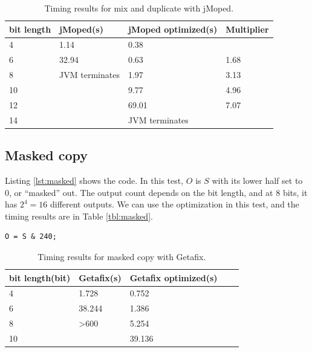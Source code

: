 \begin{table}[!h]
\begin{center}
\begin{tabular}{|l|l|l|l|}
\hline
bit length & jMoped(s) & jMoped optimized(s) & Multiplier \\ \hline
4 & 1.14 & 0.38 &  \\ \hline
6 & 32.94 & 0.63 & 1.68 \\ \hline
8 & JVM terminates & 1.97 & 3.13 \\ \hline
10 &  & 9.77 & 4.96 \\ \hline
12 &  & 69.01 & 7.07 \\ \hline
14 &  & JVM terminates &  \\ \hline
\end{tabular}
\end{center}
\caption{Timing results for mix and duplicate with jMoped.}
\label{tbl:mixJ}
\end{table}


\subsection{Masked copy}
Listing \ref{lst:masked} shows the code. In this test, $O$ is $S$ with its lower half set to $0$, or ``masked'' out. The output count depends on the bit length, and at $8$ bits, it has $2^{4} = 16$ different outputs. We can use the optimization in this test, and the timing results are in Table \ref{tbl:masked}.

\lstset{language=C}  
\begin{lstlisting}[float=!h, caption={Masked copy test program at 8 bits.},label=lst:masked]
O = S & 240;
\end{lstlisting}

\begin{table}[!h]
\centering
\begin{tabular}{|l|l|l|l|l|}
\hline
{bit length(bit)} & Getafix(s) & {Getafix optimized(s)}\\ \hline
4 & 1.728 & 0.752  \\ \hline
6 & 38.244 & 1.386 \\ \hline
8 & \textgreater 600 & 5.254  \\ \hline
10 &  & 39.136  \\ \hline
\end{tabular}
\caption{Timing results for masked copy with Getafix.}
\label{tbl:maskedG}
\end{table}

